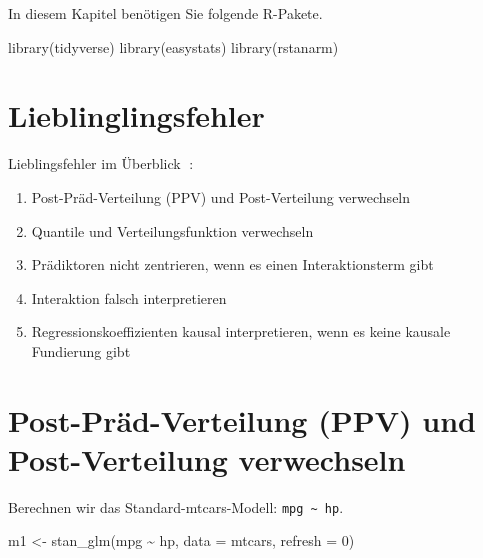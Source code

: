 \documentclass[
  a4paper,
  DIV=11]{scrreprt}
\newenvironment{Shaded}{\begin{snugshade}}{\end{snugshade}}
\newcommand{\AttributeTok}[1]{\textcolor[rgb]{0.40,0.45,0.13}{#1}}
\newcommand{\DecValTok}[1]{\textcolor[rgb]{0.68,0.00,0.00}{#1}}
\newcommand{\FunctionTok}[1]{\textcolor[rgb]{0.28,0.35,0.67}{#1}}
\newcommand{\NormalTok}[1]{\textcolor[rgb]{0.00,0.23,0.31}{#1}}
\newcommand{\OtherTok}[1]{\textcolor[rgb]{0.00,0.23,0.31}{#1}}
\newcommand{\SpecialCharTok}[1]{\textcolor[rgb]{0.37,0.37,0.37}{#1}}
\providecommand{\tightlist}{%
  \setlength{\itemsep}{0pt}\setlength{\parskip}{0pt}}\usepackage{longtable,booktabs,array}
\theoremstyle{definition}
\theoremstyle{remark}
\begin{document}
In diesem Kapitel benötigen Sie folgende R-Pakete.

\begin{Shaded}
\begin{Highlighting}[]
\FunctionTok{library}\NormalTok{(tidyverse)}
\FunctionTok{library}\NormalTok{(easystats)}
\FunctionTok{library}\NormalTok{(rstanarm)}
\end{Highlighting}
\end{Shaded}

\hypertarget{lieblinglingsfehler}{%
\section{Lieblinglingsfehler}\label{lieblinglingsfehler}}

Lieblingsfehler im Überblick 🤷:

\begin{enumerate}
\def\labelenumi{\arabic{enumi}.}
\tightlist
\item
  Post-Präd-Verteilung (PPV) und Post-Verteilung verwechseln
\item
  Quantile und Verteilungsfunktion verwechseln
\item
  Prädiktoren nicht zentrieren, wenn es einen Interaktionsterm gibt
\item
  Interaktion falsch interpretieren
\item
  Regressionskoeffizienten kausal interpretieren, wenn es keine kausale
  Fundierung gibt
\end{enumerate}

\hypertarget{post-pruxe4d-verteilung-ppv-und-post-verteilung-verwechseln}{%
\section{Post-Präd-Verteilung (PPV) und Post-Verteilung verwechseln
🤷}\label{post-pruxe4d-verteilung-ppv-und-post-verteilung-verwechseln}}

Berechnen wir das Standard-mtcars-Modell:
\texttt{mpg\ \textasciitilde{}\ hp}.

\begin{Shaded}
\begin{Highlighting}[]
\NormalTok{m1 }\OtherTok{\textless{}{-}} \FunctionTok{stan\_glm}\NormalTok{(mpg }\SpecialCharTok{\textasciitilde{}}\NormalTok{ hp, }\AttributeTok{data =}\NormalTok{ mtcars, }\AttributeTok{refresh =} \DecValTok{0}\NormalTok{)}
\end{Highlighting}
\end{Shaded}
\end{document}
